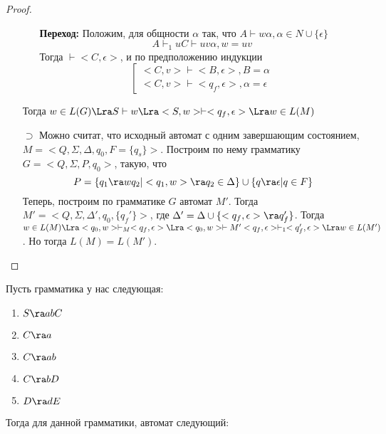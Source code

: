 \begin{proof}
\begin{enumerate}
\begin{enumerate}
            \item[] \textbf{Переход:} 
            Положим, для общности \(\alpha\) так, что \(A \vdash w\alpha, \alpha \in N \cup \{\epsilon\}\)
            \[A \vdash_1 uC \vdash uv\alpha, w = uv\]
            Тогда \(<A, u> \vdash <C, \epsilon>\), и по предположению индукции
            \[\left[\begin{array}{l}
                <C, v> \vdash <B, \epsilon>, B = \alpha \\
                <C, v> \vdash <q_f, \epsilon>, \alpha = \epsilon
            \end{array}\right.\]
        \end{enumerate}

        Тогда \(w \in L(G) \Lra S \vdash w \Lra <S, w> \vdash <q_f, \epsilon> \Lra w \in L(M)\)

        \item[\(\supset\)] Можно считат, что исходный автомат с одним завершающим состоянием, \(M = <Q, \Sigma, \Delta, q_0, F = \{q_s\}>\). Построим по нему грамматику \(G = <Q, \Sigma, P, q_0>\), такую, что
        \[P = \{q_1 \ra wq_2 | <q_1, w> \ra q_2 \in \Delta\} \cup \{q \ra \epsilon | q \in F\}\]
        Теперь, построим по грамматике \(G\) автомат \(M'\). Тогда \(M' = <Q, \Sigma, \Delta', q_0, \{q_f'\}>\), где \(\Delta' = \Delta \cup \{<q_f, \epsilon> \ra q_f'\}\). Тогда \(w \in L(M) \Lra <q_0, w> \vdash_M <q_f, \epsilon> \Lra <q_0, w> \vdash{M'} <q_f, \epsilon> \vdash_1 <q_f', \epsilon> \Lra w \in L(M')\). Но тогда \(L(M) = L(M')\).
    \end{enumerate}
\end{proof}

\begin{example}
    Пусть грамматика у нас следующая:
    \begin{enumerate}
        \item \(S \ra abC\)
        \item \(C \ra a\)
        \item \(C \ra ab\)
        \item \(C \ra bD\)
        \item \(D \ra dE\)
    \end{enumerate}
    Тогда для данной грамматики, автомат следующий:
    \begin{center}\end{center}
\end{example}

